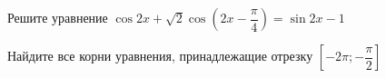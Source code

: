 \begin{ex}
	\begin{condition}
		\begin{enumcols}[label=\asbuk*)]
			\item Решите уравнение \( \cos 2x + \sqrt{2}\cos{\left(2x-  \dfrac{\pi}{4}\right)} = \sin 2x - 1  \)
			\item Найдите все корни уравнения, принадлежащие отрезку \( \left[-2\pi;-\dfrac{\pi}{2}\right]  \)
		\end{enumcols}
	\end{condition}
\end{ex}